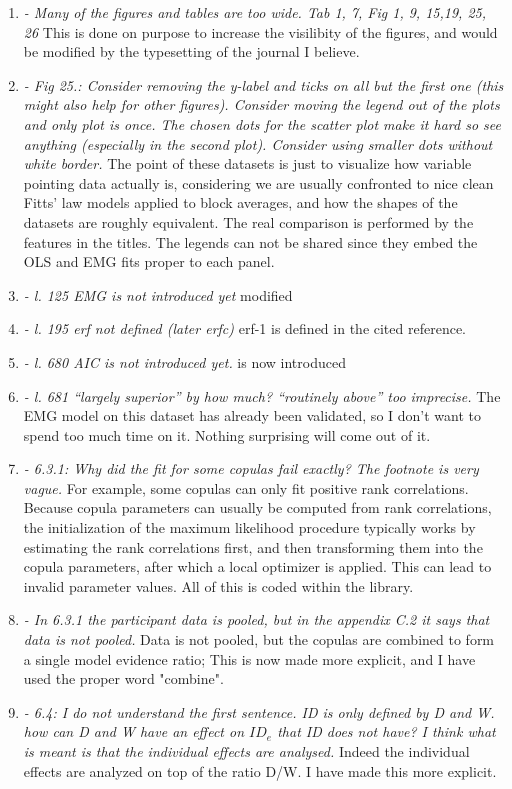 \documentclass{article}
\begin{document}
\begin{enumerate}
    \item \textit{-	Many of the figures and tables are too wide.  Tab 1, 7, Fig 1, 9, 15,19, 25, 26} This is done on purpose to increase the visilibity of the figures, and would be modified by the typesetting of the journal I believe.
	\item \textit{-	Fig 25.: Consider removing the y-label and ticks on all but the first one (this might also help for other figures). Consider moving the legend out of the plots and only plot is once. The chosen dots for the scatter plot make it hard so see anything (especially in the second plot). Consider using smaller dots without white border.} The point of these datasets is just to visualize how variable pointing data actually is, considering we are usually confronted to nice clean Fitts' law models applied to block averages, and how the shapes of the datasets are roughly equivalent. The real comparison is performed by the features in the titles. The legends can not be shared since they embed the OLS and EMG fits proper to each panel.
	\item \textit{-	l. 125 EMG is not introduced yet} modified
	\item \textit{-	l. 195 erf not defined (later erfc)} erf-1 is defined in the cited reference. 
	\item \textit{-	l. 680 AIC is not introduced yet. } is now introduced
	\item \textit{-	l. 681 “largely superior” by how much? “routinely above” too imprecise.} The EMG model on this dataset has already been validated, so I don't want to spend too much time on it. Nothing surprising will come out of it.
	\item \textit{-	6.3.1: Why did the fit for some copulas fail exactly? The footnote is very vague.} For example, some copulas can only fit positive rank correlations. Because copula parameters can usually be computed from rank correlations, the initialization of the maximum likelihood procedure typically works by estimating the rank correlations first, and then transforming them into the copula parameters, after which a local optimizer is applied. This can lead to invalid parameter values. All of this is coded within the library.
	\item \textit{-	In 6.3.1 the participant data is pooled, but in the appendix C.2 it says that data is not pooled.} Data is not pooled, but the copulas are combined to form a single model evidence ratio; This is now made more explicit, and I have used the proper word "combine".
	\item \textit{-	6.4: I do not understand the first sentence. ID is only defined by D and W. how can D and W have an effect on $ID_e$ that ID does not have? I think what is meant is that the individual effects are analysed.} Indeed the individual effects are analyzed on top of the ratio D/W. I have made this more explicit.
\end{enumerate}
\end{document}
